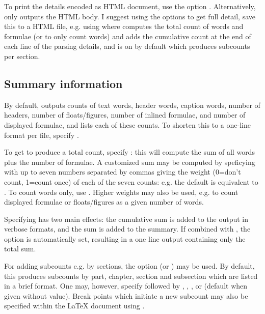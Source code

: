 \documentclass{article}
\begin{document}
To print the details encoded as HTML document, use the option . Alternatively,  only outputs the HTML body. I suggest using the options  to get full detail, save this to a HTML file, e.g. using
where  computes the total count of words and formulae (or  to only count words) and adds the cumulative count at the end of each line of the parsing details, and  is on by default which produces subcounts per section.

\subsection{Summary information}

By default, \TeXcount{} outputs counts of text words, header words, caption words, number of headers, number of floats/figures, number of inlined formulae, and number of displayed formulae, and lists each of these counts. To shorten this to a one-line format per file, specify .

To get \TeXcount{} to produce a total count, specify : this will compute the sum of all words plus the number of formulae. A customized sum may be computed by speficying  with up to seven numbers separated by commas giving the weight (0=don't count, 1=count once) of each of the seven counts: e.g. the default is equivalent to . To count words only, use . Higher weights may also be used, e.g. to count displayed formulae or floats/figures as a given number of words.

Specifying  has two main effects: the cumulative sum is added to the output in verbose formats, and the sum is added to the summary. If combined with , the option  is automatically set, resulting in a one line output containing only the total sum.

For adding subcounts e.g. by sections, the option  (or ) may be used. By default, this produces subcounts by part, chapter, section and subsection which are listed in a brief format. One may, however, specify  followed by , , , or  (default when given without value). Break points which initiate a new subcount may also be specified within the \LaTeX{} document using .
\end{document}
